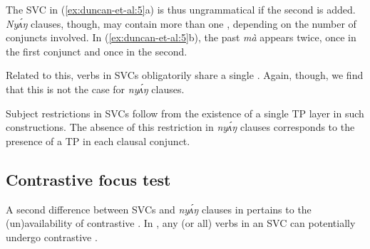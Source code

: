 \documentclass[output=paper,modfonts,nonflat,
]{langsci/langscibook}
\begin{document}
\noindent The SVC in (\ref{ex:duncan-et-al:5}a) is thus ungrammatical if the second  is added. \textit{Ny\'{ʌ}ŋ} clauses, though, may contain more than one , depending on the number of conjuncts involved. In (\ref{ex:duncan-et-al:5}b), the past  \textit{mà} appears twice, once in the first conjunct and once in the second.

Related to this, verbs in  SVCs obligatorily share a single . Again, though, we find that this is not the case for \textit{ny\'{ʌ}ŋ} clauses.

\ea\label{ex:duncan-et-al:6}
\z
\z

\noindent Subject restrictions in  SVCs follow from the existence of a single TP layer in such constructions. The absence of this restriction in \textit{ny\'{ʌ}ŋ} clauses corresponds to the presence of a TP in each clausal conjunct.

\subsection{Contrastive focus test}\label{sec:duncan-et-al:2.2}

A second difference between SVCs and \textit{ny\'{ʌ}ŋ} clauses in  pertains to the (un)availability of contrastive . In , any (or all) verbs in an SVC can potentially undergo contrastive .

\ea\label{ex:duncan-et-al:7}
\z
\z
\end{document}
